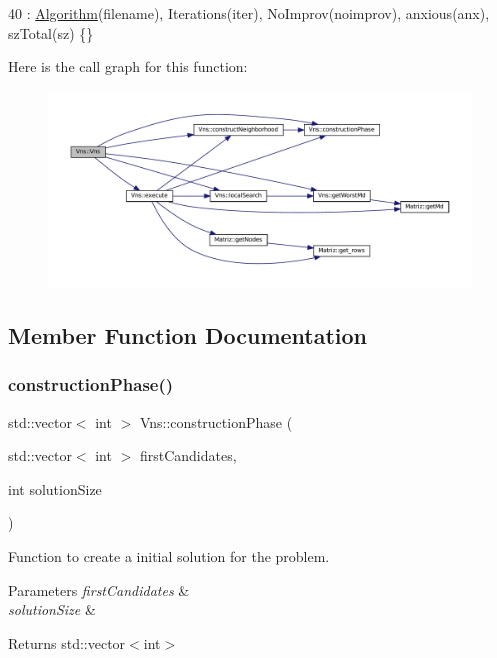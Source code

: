 \begin{DoxyCode}
40 : \hyperlink{classAlgorithm_a89df1d2c6751f70733f38daa0ee2a13b}{Algorithm}(filename), Iterations(iter), NoImprov(noimprov), anxious(anx), szTotal(sz) \{\}
\end{DoxyCode}
Here is the call graph for this function\+:
\nopagebreak
\begin{figure}[H]
\begin{center}
\leavevmode
\includegraphics[width=350pt]{classVns_a82c0b5f02b3b7c35483e9e0e508e34ae_cgraph}
\end{center}
\end{figure}


\subsection{Member Function Documentation}
\mbox{\label{classVns_aefd9719db68183a6b2ec871c86226ee4}} 
\subsubsection{\texorpdfstring{construction\+Phase()}{constructionPhase()}}
{\footnotesize\ttfamily std\+::vector$<$ int $>$ Vns\+::construction\+Phase (\begin{DoxyParamCaption}\item[{std\+::vector$<$ int $>$}]{first\+Candidates,  }\item[{int}]{solution\+Size }\end{DoxyParamCaption})}



Function to create a initial solution for the problem. 


\begin{DoxyParams}{Parameters}
{\em first\+Candidates} & \\
\hline
{\em solution\+Size} & \\
\hline
\end{DoxyParams}
\begin{DoxyReturn}{Returns}
std\+::vector$<$int$>$ 
\end{DoxyReturn}

